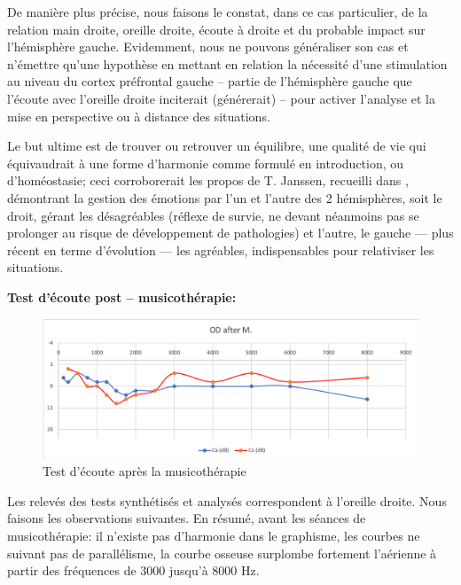 De manière plus précise, nous faisons le constat, dans ce cas
particulier,  de la relation main droite, oreille droite, écoute
à droite et du probable impact sur l'hémisphère gauche.
Evidemment, nous ne pouvons généraliser son cas et 
n'émettre qu'une hypothèse
en mettant en relation la nécessité d'une stimulation au niveau du cortex préfrontal
gauche -- partie de l'hémisphère gauche que l'écoute avec
l'oreille droite inciterait (générerait) -- pour activer l'analyse et la
mise en perspective ou à distance des situations.

Le but ultime est de trouver ou
retrouver un équilibre, une qualité de vie qui équivaudrait à une forme d'harmonie comme formulé en 
introduction, ou d'homéostasie;  ceci
corroborerait les
propos de T. Janssen, recueilli dans  \autocite {van_eersel_cerveau}, démontrant la gestion des 
émotions par
l'un et l'autre des 2 hémisphères, soit le droit,  gérant les désagréables
(réflexe de survie, ne devant néanmoins pas se prolonger au risque de
développement de pathologies)
et l'autre, le gauche --- plus récent en terme d'évolution ---  les
agréables, indispensables pour relativiser les situations.

\textbf{ Test d'écoute post -- musicothérapie:}



\begin{figure}[h]
	\centering
	
	\includegraphics[width=1\linewidth]{images/clinique/od_after_m.png}
	\caption{Test d'écoute après la musicothérapie}
	\label{fig:odaftermeyer}
\end{figure}
Les relevés des tests synthétisés et analysés correspondent à l'oreille droite.
Nous faisons les observations suivantes.
En résumé, avant les séances de musicothérapie: il n'existe pas d'harmonie dans le graphisme, les 
courbes ne suivant pas de 
parallélisme, la courbe osseuse  surplombe fortement l'aérienne 
à partir des fréquences de 3000 jusqu'à 8000 Hz.


